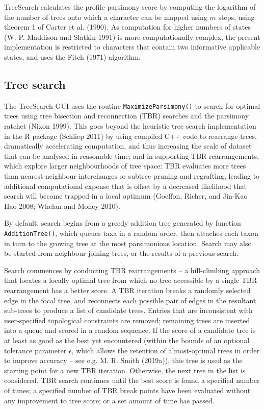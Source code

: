 TreeSearch calculates the profile parsimony score by computing the logarithm of
the number of trees onto which a character can be mapped using \(m\) steps, using
theorem 1 of Carter et al. (1990). As computation for higher numbers of states
(W. P. Maddison and Slatkin 1991) is more computationally complex, the present implementation is
restricted to characters that contain two informative applicable states, and
uses the Fitch (1971) algorithm.

\hypertarget{tree-search}{%
\subsection{Tree search}\label{tree-search}}

The TreeSearch GUI uses the routine \texttt{MaximizeParsimony()} to search for optimal
trees using tree bisection and reconnection (TBR) searches and the parsimony
ratchet (Nixon 1999). This goes beyond the heuristic tree search implementation
in the R package  (Schliep 2011) by using compiled C++ code to
rearrange trees, dramatically accelerating computation, and thus increasing the
scale of dataset that can be analysed in reasonable time; and in supporting TBR
rearrangements, which explore larger neighbourhoods of tree space: TBR evaluates
more trees than nearest-neighbour interchanges or subtree pruning and
regrafting, leading to additional computational expense that is offset by a
decreased likelihood that search will become trapped in a local optimum
(Goeffon, Richer, and Jin-Kao Hao 2008; Whelan and Money 2010).

By default, search begins from a greedy addition tree generated by function
\texttt{AdditionTree()}, which queues taxa in a random order, then attaches each taxon
in turn to the growing tree at the most parsimonious location. Search may also
be started from neighbour-joining trees, or the results of a previous search.

Search commences by conducting TBR rearrangements -- a hill-climbing approach
that locates a locally optimal tree from which no tree accessible by a single
TBR rearrangement has a better score. A TBR iteration breaks a randomly selected
edge in the focal tree, and reconnects each possible pair of edges in the
resultant sub-trees to produce a list of candidate trees. Entries that are
inconsistent with user-specified topological constraints are removed; remaining
trees are inserted into a queue and scored in a random sequence. If the score of
a candidate tree is at least as good as the best yet encountered (within the
bounds of an optional tolerance parameter \(\epsilon\), which allows the retention
of almost-optimal trees in order to improve accuracy -- see e.g. M. R. Smith (2019a)),
this tree is used as the starting point for a new TBR iteration. Otherwise, the
next tree in the list is considered. TBR search continues until the best score
is found a specified number of times; a specified number of TBR break points
have been evaluated without any improvement to tree score; or a set amount of
time has passed.

